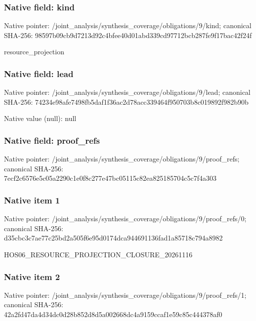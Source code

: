 \documentclass[10pt,a4paper]{article}
\begin{document}
\subsubsection{Native field: kind}
Native pointer: /joint\_\allowbreak{}analysis/synthesis\_\allowbreak{}coverage/obligations/9/kind; canonical SHA-256: 98597b09cb9d7213d92c4bfee40d01abd339cd97712bcb287fe9f17bac42f24f

\begingroup\raggedright\sloppy resource\_\allowbreak{}projection\par\endgroup

\subsubsection{Native field: lead}
Native pointer: /joint\_\allowbreak{}analysis/synthesis\_\allowbreak{}coverage/obligations/9/lead; canonical SHA-256: 74234e98afe7498fb5daf1f36ac2d78acc339464f950703b8c019892f982b90b

Native value (null): null

\subsubsection{Native field: proof\_\allowbreak{}refs}
Native pointer: /joint\_\allowbreak{}analysis/synthesis\_\allowbreak{}coverage/obligations/9/proof\_\allowbreak{}refs; canonical SHA-256: 7ecf2c6576e5c05a2290c1e0f8c277e47bc05115c82ea825185704c5c7f4a303

\subsubsection{Native item 1}
Native pointer: /joint\_\allowbreak{}analysis/synthesis\_\allowbreak{}coverage/obligations/9/proof\_\allowbreak{}refs/0; canonical SHA-256: d35cbc3c7ae77c25bd2a505f6e95d0174dca944691136fad1a85718c794a8982

\begingroup\raggedright\sloppy HOS06\_\allowbreak{}RESOURCE\_\allowbreak{}PROJECTION\_\allowbreak{}CLOSURE\_\allowbreak{}20261116\par\endgroup

\subsubsection{Native item 2}
Native pointer: /joint\_\allowbreak{}analysis/synthesis\_\allowbreak{}coverage/obligations/9/proof\_\allowbreak{}refs/1; canonical SHA-256: 42a2fd47da4d34dc0d28b852d8d5a002668dc4a9159ccaf1e59c85c444378af0
\end{document}
